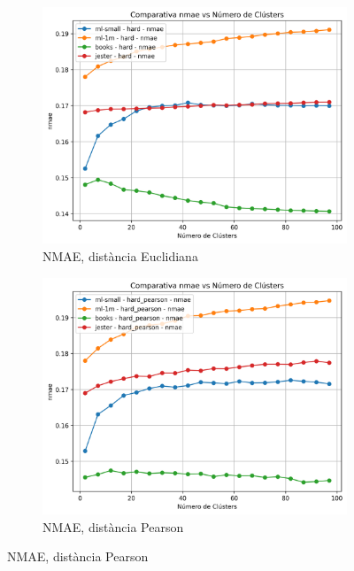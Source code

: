 \documentclass[a4paper,12pt]{report}
\begin{document}
\begin{figure}[H]
    \centering
    \begin{subfigure}[b]{0.49\textwidth}
        \includegraphics[width=\textwidth]{Figuras/nmae-hard-all.png}
        \caption{NMAE, distància Euclidiana}
        \label{fig:hard-clustering-results-a}
    \end{subfigure}
    \hfill
    \begin{subfigure}[b]{0.49\textwidth}
        \includegraphics[width=\textwidth]{Figuras/nmae-hard_pearson-all.png}
        \caption{NMAE, distància Pearson}
        \label{fig:hard-clustering-results-b}
    \end{subfigure}


\end{figure}
\end{document}
